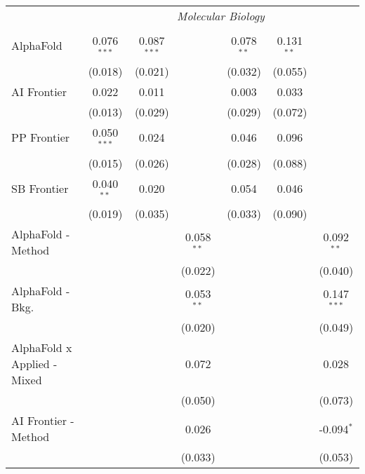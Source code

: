 \begin{tabular}{lcccccc}
 & \multicolumn{6}{c}{\textit{Molecular Biology}} \\ \\
   AlphaFold                     & 0.076$^{***}$ & 0.087$^{***}$ &              & 0.078$^{**}$ & 0.131$^{**}$ &   \\   
                                 & (0.018)       & (0.021)       &              & (0.032)      & (0.055)      &   \\   
   AI Frontier                   & 0.022         & 0.011         &              & 0.003        & 0.033        &   \\   
                                 & (0.013)       & (0.029)       &              & (0.029)      & (0.072)      &   \\   
   PP Frontier                   & 0.050$^{***}$ & 0.024         &              & 0.046        & 0.096        &   \\   
                                 & (0.015)       & (0.026)       &              & (0.028)      & (0.088)      &   \\   
   SB Frontier                   & 0.040$^{**}$  & 0.020         &              & 0.054        & 0.046        &   \\   
                                 & (0.019)       & (0.035)       &              & (0.033)      & (0.090)      &   \\   
   AlphaFold - Method            &               &               & 0.058$^{**}$ &              &              & 0.092$^{**}$\\   
                                 &               &               & (0.022)      &              &              & (0.040)\\   
   AlphaFold - Bkg.              &               &               & 0.053$^{**}$ &              &              & 0.147$^{***}$\\   
                                 &               &               & (0.020)      &              &              & (0.049)\\   
   AlphaFold x Applied - Mixed   &               &               & 0.072        &              &              & 0.028\\   
                                 &               &               & (0.050)      &              &              & (0.073)\\   
   AI Frontier - Method          &               &               & 0.026        &              &              & -0.094$^{*}$\\   
                                 &               &               & (0.033)      &              &              & (0.053)\\   

\end{tabular}
